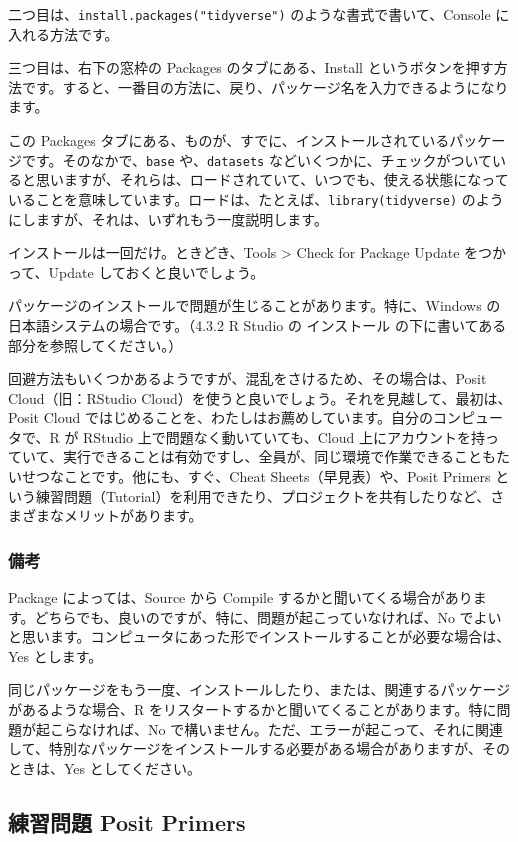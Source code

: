 \documentclass[
]{bxjsbook}
\theoremstyle{definition}
\theoremstyle{definition}
\theoremstyle{definition}
\theoremstyle{definition}
\theoremstyle{remark}
\begin{document}
二つ目は、\texttt{install.packages("tidyverse")} のような書式で書いて、Console に入れる方法です。

三つ目は、右下の窓枠の Packages のタブにある、Install というボタンを押す方法です。すると、一番目の方法に、戻り、パッケージ名を入力できるようになります。

この Packages タブにある、ものが、すでに、インストールされているパッケージです。そのなかで、\texttt{base} や、\texttt{datasets} などいくつかに、チェックがついていると思いますが、それらは、ロードされていて、いつでも、使える状態になっていることを意味しています。ロードは、たとえば、\texttt{library(tidyverse)} のようにしますが、それは、いずれもう一度説明します。

インストールは一回だけ。ときどき、Tools \textgreater{} Check for Package Update をつかって、Update しておくと良いでしょう。

パッケージのインストールで問題が生じることがあります。特に、Windows の日本語システムの場合です。（4.3.2 R Studio の インストール の下に書いてある部分を参照してください。）

回避方法もいくつかあるようですが、混乱をさけるため、その場合は、Posit Cloud（旧：RStudio Cloud）を使うと良いでしょう。それを見越して、最初は、Posit Cloud ではじめることを、わたしはお薦めしています。自分のコンピュータで、R が RStudio 上で問題なく動いていても、Cloud 上にアカウントを持っていて、実行できることは有効ですし、全員が、同じ環境で作業できることもたいせつなことです。他にも、すぐ、Cheat Sheets（早見表）や、Posit Primers という練習問題（Tutorial）を利用できたり、プロジェクトを共有したりなど、さまざまなメリットがあります。

\hypertarget{ux5099ux8003}{%
\subsubsection{備考}\label{ux5099ux8003}}

Package によっては、Source から Compile するかと聞いてくる場合があります。どちらでも、良いのですが、特に、問題が起こっていなければ、No でよいと思います。コンピュータにあった形でインストールすることが必要な場合は、Yes とします。

同じパッケージをもう一度、インストールしたり、または、関連するパッケージがあるような場合、R をリスタートするかと聞いてくることがあります。特に問題が起こらなければ、No で構いません。ただ、エラーが起こって、それに関連して、特別なパッケージをインストールする必要がある場合がありますが、そのときは、Yes としてください。

\hypertarget{ux7df4ux7fd2ux554fux984c-posit-primers}{%
\subsection{練習問題 Posit Primers}\label{ux7df4ux7fd2ux554fux984c-posit-primers}}
\end{document}
